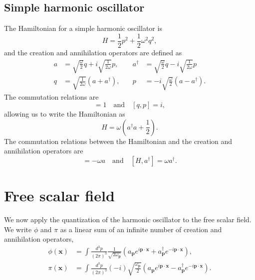 \subsection{Simple harmonic oscillator}
The Hamiltonian for a simple harmonic oscillator is
\begin{equation}
  H=\frac{1}{2}p^2+\frac{1}{2}\omega^2q^2,
\end{equation}
and the creation and annihilation operators are defined as
\begin{equation}
  \begin{aligned}
    a&=\sqrt{\frac{\omega}{2}}q+i\sqrt{\frac{1}{2\omega}}p, &\quad a^\dagger&=\sqrt{\frac{\omega}{2}}q-i\sqrt{\frac{1}{2\omega}}p\\
    q&=\sqrt{\frac{1}{2\omega}}(a+a^\dagger), &\quad p&=-i\sqrt{\frac{\omega}{2}}(a-a^\dagger). 
  \end{aligned}
\end{equation}
The commutation relations are 
\begin{equation}
  [a,a^\dagger]=1 \quad \text{and} \quad [q,p]=i,
\end{equation}
allowing us to write the Hamiltonian as 
\begin{equation}
  H=\omega\left(a^\dagger a+\frac{1}{2}\right). 
\end{equation}
The commutation relations between the Hamiltonian and the creation and annihilation operators are
\begin{equation}
  [H,a]=-\omega a \quad \text{and} \quad [H,a^\dagger]=\omega a^\dagger. 
\end{equation}

\section{Free scalar field}
We now apply the quantization of the harmonic oscillator to the free scalar field. We write $\phi$ and $\pi$ as a linear sum of an infinite number of creation and annihilation operators, 
\begin{equation}
  \begin{aligned}
    \phi(\mathbf{x})&=\int \frac{d^3p}{(2\pi)^3}\frac{1}{\sqrt{2\omega_{\mathbf{p}}}}\left(a_{\mathbf{p}}e^{i\mathbf{p}\cdot\mathbf{x}}+a_{\mathbf{p}}^\dagger e^{-i\mathbf{p}\cdot\mathbf{x}}\right),\\
    \pi(\mathbf{x})&=\int \frac{d^3p}{(2\pi)^3}(-i)\sqrt{\frac{\omega_{\mathbf{p}}}{2}}\left(a_{\mathbf{p}}e^{i\mathbf{p}\cdot\mathbf{x}}-a_{\mathbf{p}}^\dagger e^{-i\mathbf{p}\cdot\mathbf{x}}\right). 
  \end{aligned}
\end{equation}
